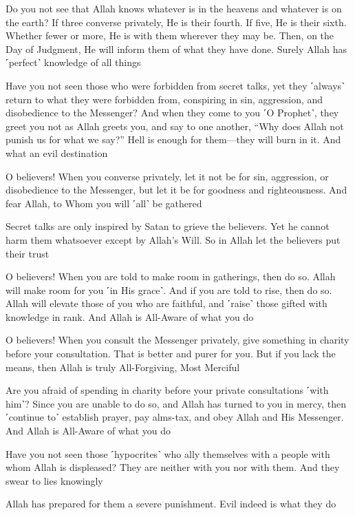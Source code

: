 Do you not see that Allah knows whatever is in the heavens and whatever is on the earth? If three converse privately, He is their fourth. If five, He is their sixth. Whether fewer or more, He is with them wherever they may be. Then, on the Day of Judgment, He will inform them of what they have done. Surely Allah has ˹perfect˺ knowledge of all things

Have you not seen those who were forbidden from secret talks, yet they ˹always˺ return to what they were forbidden from, conspiring in sin, aggression, and disobedience to the Messenger? And when they come to you ˹O Prophet˺, they greet you not as Allah greets you, and say to one another, “Why does Allah not punish us for what we say?” Hell is enough for them—they will burn in it. And what an evil destination

O believers! When you converse privately, let it not be for sin, aggression, or disobedience to the Messenger, but let it be for goodness and righteousness. And fear Allah, to Whom you will ˹all˺ be gathered

Secret talks are only inspired by Satan to grieve the believers. Yet he cannot harm them whatsoever except by Allah’s Will. So in Allah let the believers put their trust

O believers! When you are told to make room in gatherings, then do so. Allah will make room for you ˹in His grace˺. And if you are told to rise, then do so. Allah will elevate those of you who are faithful, and ˹raise˺ those gifted with knowledge in rank. And Allah is All-Aware of what you do

O believers! When you consult the Messenger privately, give something in charity before your consultation. That is better and purer for you. But if you lack the means, then Allah is truly All-Forgiving, Most Merciful

Are you afraid of spending in charity before your private consultations ˹with him˺? Since you are unable to do so, and Allah has turned to you in mercy, then ˹continue to˺ establish prayer, pay alms-tax, and obey Allah and His Messenger. And Allah is All-Aware of what you do

Have you not seen those ˹hypocrites˺ who ally themselves with a people with whom Allah is displeased? They are neither with you nor with them. And they swear to lies knowingly

Allah has prepared for them a severe punishment. Evil indeed is what they do

